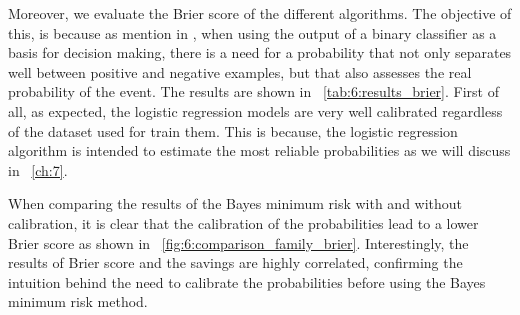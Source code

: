 Moreover, we evaluate the Brier score of the different algorithms. The objective of this, is 
because as mention in  \citep{cohen2004}, when using the output of a binary classifier as a basis 
for decision making, there is a need for a probability that not only separates well between positive 
and negative examples, but that also assesses the real probability of the event. The results are 
shown in \tablename{~\ref{tab:6:results_brier}}. First of all, as expected, the logistic regression 
models are very well calibrated regardless of the dataset used for train them. This is because, the 
logistic regression algorithm is intended to estimate the most reliable probabilities as we will 
discuss in \chaptername{~\ref{ch:7}}.

When comparing the results of the Bayes minimum risk with and without calibration, it is clear that 
the calibration of the probabilities lead to a lower Brier score as shown in 
\figurename{~\ref{fig:6:comparison_family_brier}}. Interestingly, the results of Brier score 
and the savings are highly correlated, confirming the intuition behind the need to calibrate the 
probabilities before using the Bayes minimum risk method.

